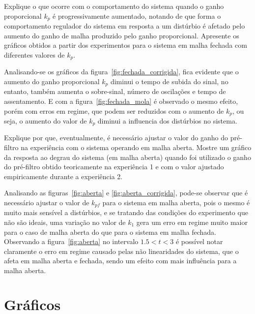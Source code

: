 \documentclass{ZenTera}
\begin{document}
\begin{questions}
\question Explique o que ocorre com o comportamento do sistema quando o ganho proporcional $k_p$ é progressivamente aumentado, notando de que forma o comportamento regulador do sistema em resposta a um distúrbio é afetado pelo aumento do ganho de malha produzido pelo ganho proporcional.
Apresente os gráficos obtidos a partir dos experimentos para o sistema em malha fechada com diferentes valores de $k_p$.

    \begin{solution}
    Analisando-se os gráficos da figura~\ref{fig:fechada_corrigida}, fica evidente que o aumento do ganho proporcional $k_p$ diminui o tempo de subida do sinal, no entanto, também aumenta o sobre-sinal, número de oscilações e tempo de assentamento. E com a figura~\ref{fig:fechada_mola} é observado o mesmo efeito, porém com erros em regime, que podem ser reduzidos com o aumento de $k_p$, ou seja, o aumento do valor de $k_p$ diminui a influencia dos distúrbios no sistema. 
    \end{solution}
    
\question Explique por que, eventualmente, é necessário ajustar o valor do ganho do pré-filtro na experiência com o sistema operando em malha aberta. 
Mostre um gráfico da resposta ao degrau do sistema (em malha aberta) quando foi utilizado o ganho do pré-filtro obtido teoricamente na experiência 1 e com o valor ajustado empiricamente durante a experiência 2.

    \begin{solution}
    Analisando as figuras~\ref{fig:aberta} e \ref{fig:aberta_corrigida}, pode-se observar que é necessário ajustar o valor de $k_{pf}$ para o sistema em malha aberta, pois o mesmo é muito mais sensível a distúrbios, e se tratando das condições do experimento que não são ideais, uma variação no valor de $k_1$ gera um erro em regime muito maior para o caso de malha aberta do que para o sistema em malha fechada.
    Observando a figura~\ref{fig:aberta} no intervalo $1.5<t<3$ é possível notar claramente o erro em regime causado pelas não linearidades do sistema, que o afeta em malha aberta e fechada, sendo um efeito com mais influência para a malha aberta. 
    
    
    
    \end{solution}

\end{questions}

\appendix

\section{Gráficos}

\end{document}
